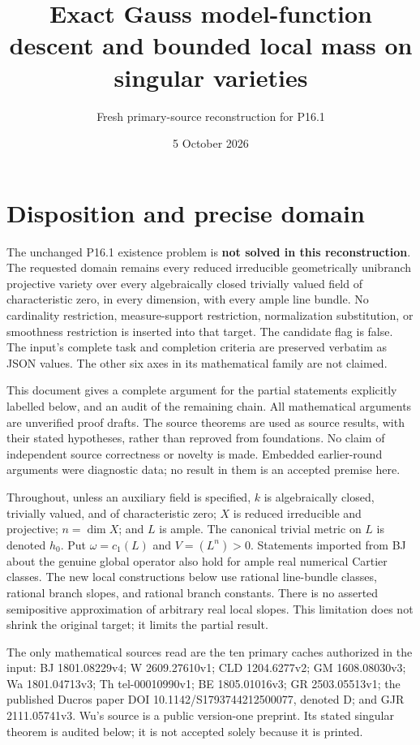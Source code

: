 \documentclass[
  11pt,
]{article}
\title{Exact Gauss model-function descent and bounded local mass on
singular varieties}
\author{Fresh primary-source reconstruction for P16.1}
\date{5 October 2026}
\begin{document}
\maketitle

\section{Disposition and precise
domain}\label{disposition-and-precise-domain}

The unchanged P16.1 existence problem is \textbf{not solved in this
reconstruction}. The requested domain remains every reduced irreducible
geometrically unibranch projective variety over every algebraically
closed trivially valued field of characteristic zero, in every
dimension, with every ample line bundle. No cardinality restriction,
measure-support restriction, normalization substitution, or smoothness
restriction is inserted into that target. The candidate flag is false.
The input's complete task and completion criteria are preserved verbatim
as JSON values. The other six axes in its mathematical family are not
claimed.

This document gives a complete argument for the partial statements
explicitly labelled below, and an audit of the remaining chain. All
mathematical arguments are unverified proof drafts. The source theorems
are used as source results, with their stated hypotheses, rather than
reproved from foundations. No claim of independent source correctness or
novelty is made. Embedded earlier-round arguments were diagnostic data;
no result in them is an accepted premise here.

Throughout, unless an auxiliary field is specified, \(k\) is
algebraically closed, trivially valued, and of characteristic zero;
\(X\) is reduced irreducible and projective; \(n=\dim X\); and \(L\) is
ample. The canonical trivial metric on \(L\) is denoted \(h_0\). Put
\(\omega=c_1(L)\) and \(V=(L^n)>0\). Statements imported from BJ about
the genuine global operator also hold for ample real numerical Cartier
classes. The new local constructions below use rational line-bundle
classes, rational branch slopes, and rational branch constants. There is
no asserted semipositive approximation of arbitrary real local slopes.
This limitation does not shrink the original target; it limits the
partial result.

The only mathematical sources read are the ten primary caches authorized
in the input: BJ 1801.08229v4; W 2609.27610v1; CLD 1204.6277v2; GM
1608.08030v3; Wa 1801.04713v3; Th tel-00010990v1; BE 1805.01016v3; GR
2503.05513v1; the published Ducros paper DOI 10.1142/S1793744212500077,
denoted D; and GJR 2111.05741v3. Wu's source is a public version-one
preprint. Its stated singular theorem is audited below; it is not
accepted solely because it is printed.
\end{document}
